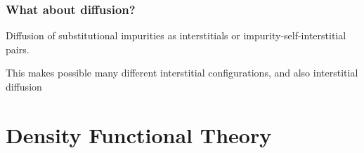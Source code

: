 \documentclass[11pt,bibliography=totoc,index=totoc]{scrbook}   %
\begin{document}






%
\subsection{What about diffusion?}
%

Diffusion of substitutional impurities as interstitials or impurity-self-interstitial pairs.

This makes possible many different interstitial configurations, and also interstitial diffusion


%
\chapter{Density Functional Theory}\label{cha:dft}
%
\end{document}
